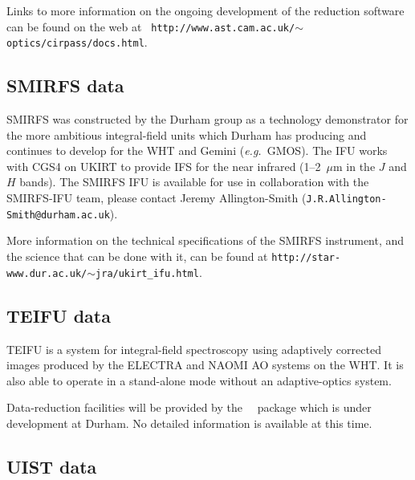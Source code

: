 \documentclass[twoside,11pt]{article}
\newcommand{\htmladdnormallink}[2]{#1}
\newcommand{\htmlref}[2]{#1}
\newcommand{\xlabel}[1]{}
\newcommand{\latex}[1]{#1}
\begin{document}
\latex{Links to more information on the ongoing development of the
reduction software can be found on the web at {\tt
http://www.ast.cam.ac.uk/$\sim$optics/cirpass/docs.html}.}

\subsection{\xlabel{sc16_smirfs}SMIRFS data\label{sc16_smirfs}}

\htmladdnormallink{SMIRFS}{http://star-www.dur.ac.uk/~jra/ukirt_ifu.html}
was constructed by the Durham group as a technology demonstrator for
the more ambitious integral-field units which Durham has producing and
continues to develop for the WHT and Gemini (\emph{e.g.}\
\htmlref{GMOS}{sc16_gmos}).  The IFU works with
\htmladdnormallink{CGS4}{http://www.jach.hawaii.edu/UKIRT/instruments/cgs4/cgs4.html}
on \htmladdnormallink{UKIRT}{http://www.jach.hawaii.edu/UKIRT/}
to provide IFS for the near infrared (1--2~$\mu$m in the $J$ and $H$
bands).  The SMIRFS IFU is available for use in collaboration with the
SMIRFS-IFU team, please contact \htmladdnormallink{Jeremy
Allington-Smith}{mailto:J.R.Allington-Smith@durham.ac.uk}\latex{
({\tt J.R.Allington-Smith@durham.ac.uk})}.

\latex{More information on the technical specifications of the
SMIRFS instrument, and the science that can be done with it, can be
found at {\tt http://star-www.dur.ac.uk/$\sim$jra/ukirt\_ifu.html}.}

\subsection{\xlabel{sc16_teifu}TEIFU data\label{sc16_teifu}}

\htmladdnormallink{TEIFU}{http://star-www.dur.ac.uk/~jra/teifu.html}
is a system for integral-field spectroscopy using
adaptively corrected images produced by the
\htmladdnormallink{ELECTRA}{http://www.cfai.dur.ac.uk/fix/adaptive-optics/area_main_ao.html}
and \htmladdnormallink{NAOMI}{http://www.ing.iac.es/Astronomy/instruments/naomi/} AO
systems on the WHT.  It is also able to operate in a stand-alone
mode without an adaptive-optics system.

Data-reduction facilities will be provided by the \IMSPEC\ \IRAF\
package which is under development at Durham.  No detailed information
is available at this time.

\subsection{\xlabel{sc16_uist}UIST data\label{sc16_uist}}
\end{document}
